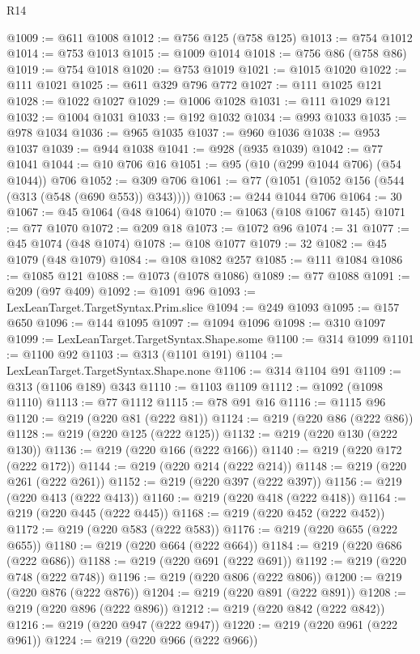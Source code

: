 \begin{lexlean}{R14}
\begin{coremodule}
@1009 := @611 @1008
@1012 := @756 @125 (@758 @125)
@1013 := @754 @1012
@1014 := @753 @1013
@1015 := @1009 @1014
@1018 := @756 @86 (@758 @86)
@1019 := @754 @1018
@1020 := @753 @1019
@1021 := @1015 @1020
@1022 := @111 @1021
@1025 := @611 @329 @796 @772
@1027 := @111 @1025 @121
@1028 := @1022 @1027
@1029 := @1006 @1028
@1031 := @111 @1029 @121
@1032 := @1004 @1031
@1033 := @192 @1032
@1034 := @993 @1033
@1035 := @978 @1034
@1036 := @965 @1035
@1037 := @960 @1036
@1038 := @953 @1037
@1039 := @944 @1038
@1041 := @928 (@935 @1039)
@1042 := @77 @1041
@1044 := @10 @706 @16
@1051 := @95 (@10 (@299 @1044 @706) (@54 @1044)) @706
@1052 := @309 @706
@1061 := @77 (@1051 (@1052 @156 (@544 (@313 (@548 (@690 @553)) @343))))
@1063 := @244 @1044 @706
@1064 := 30
@1067 := @45 @1064 (@48 @1064)
@1070 := @1063 (@108 @1067 @145)
@1071 := @77 @1070
@1072 := @209 @18
@1073 := @1072 @96
@1074 := 31
@1077 := @45 @1074 (@48 @1074)
@1078 := @108 @1077
@1079 := 32
@1082 := @45 @1079 (@48 @1079)
@1084 := @108 @1082 @257
@1085 := @111 @1084
@1086 := @1085 @121
@1088 := @1073 (@1078 @1086)
@1089 := @77 @1088
@1091 := @209 (@97 @409)
@1092 := @1091 @96
@1093 := LexLeanTarget.TargetSyntax.Prim.slice
@1094 := @249 @1093
@1095 := @157 @650
@1096 := @144 @1095
@1097 := @1094 @1096
@1098 := @310 @1097
@1099 := LexLeanTarget.TargetSyntax.Shape.some
@1100 := @314 @1099
@1101 := @1100 @92
@1103 := @313 (@1101 @191)
@1104 := LexLeanTarget.TargetSyntax.Shape.none
@1106 := @314 @1104 @91
@1109 := @313 (@1106 @189) @343
@1110 := @1103 @1109
@1112 := @1092 (@1098 @1110)
@1113 := @77 @1112
@1115 := @78 @91 @16
@1116 := @1115 @96
@1120 := @219 (@220 @81 (@222 @81))
@1124 := @219 (@220 @86 (@222 @86))
@1128 := @219 (@220 @125 (@222 @125))
@1132 := @219 (@220 @130 (@222 @130))
@1136 := @219 (@220 @166 (@222 @166))
@1140 := @219 (@220 @172 (@222 @172))
@1144 := @219 (@220 @214 (@222 @214))
@1148 := @219 (@220 @261 (@222 @261))
@1152 := @219 (@220 @397 (@222 @397))
@1156 := @219 (@220 @413 (@222 @413))
@1160 := @219 (@220 @418 (@222 @418))
@1164 := @219 (@220 @445 (@222 @445))
@1168 := @219 (@220 @452 (@222 @452))
@1172 := @219 (@220 @583 (@222 @583))
@1176 := @219 (@220 @655 (@222 @655))
@1180 := @219 (@220 @664 (@222 @664))
@1184 := @219 (@220 @686 (@222 @686))
@1188 := @219 (@220 @691 (@222 @691))
@1192 := @219 (@220 @748 (@222 @748))
@1196 := @219 (@220 @806 (@222 @806))
@1200 := @219 (@220 @876 (@222 @876))
@1204 := @219 (@220 @891 (@222 @891))
@1208 := @219 (@220 @896 (@222 @896))
@1212 := @219 (@220 @842 (@222 @842))
@1216 := @219 (@220 @947 (@222 @947))
@1220 := @219 (@220 @961 (@222 @961))
@1224 := @219 (@220 @966 (@222 @966))

\end{coremodule}
\end{lexlean}
